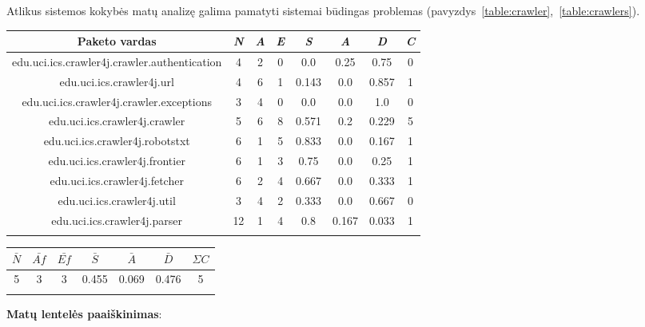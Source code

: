 Atlikus sistemos kokybės matų analizę galima pamatyti sistemai būdingas problemas (pavyzdys~\ref{table:crawler},~\ref{table:crawlers}).
\begin{center}
    \begin{tabular}{|c|c|c|c|c|c|c|c|}
        \hline
        Paketo vardas & \textit{N} & \textit{A} & \textit{E} & \textit{S} & \textit{A} & \textit{D} & \textit{C} \\ [0.5ex]
        \hline\hline
        edu.uci.ics.crawler4j.crawler.authentication & 4 & 2 & 0 & 0.0 & 0.25 & 0.75 & 0\\
        \hline
        edu.uci.ics.crawler4j.url & 4 & 6 & 1 & 0.143 & 0.0 & 0.857 & 1 \\
        \hline
        edu.uci.ics.crawler4j.crawler.exceptions & 3 & 4 & 0 & 0.0 & 0.0 & 1.0 & 0\\
        \hline
        edu.uci.ics.crawler4j.crawler & 5 & 6 & 8 & 0.571 & 0.2 & 0.229 & 5 \\
        \hline
        edu.uci.ics.crawler4j.robotstxt & 6 & 1 & 5 & 0.833 & 0.0 & 0.167 & 1 \\
        \hline
        edu.uci.ics.crawler4j.frontier & 6 & 1 & 3 & 0.75 & 0.0 & 0.25 & 1 \\
        \hline
        edu.uci.ics.crawler4j.fetcher & 6 & 2 & 4 & 0.667 & 0.0 & 0.333 & 1 \\
        \hline
        edu.uci.ics.crawler4j.util & 3 & 4 & 2 & 0.333 & 0.0 & 0.667 & 0 \\
        \hline
        edu.uci.ics.crawler4j.parser & 12 & 1 & 4 & 0.8 & 0.167 & 0.033 & 1 \\
        \hline
        \label{table:crawler}
    \end{tabular}
    \begin{tabular}{|c|c|c|c|c|c|c|}
        \hline
        $\bar{N}$ & $\bar{Af}$ & $\bar{Ef}$ & $\bar{S}$ & $\bar{A}$ & $\bar{D}$ & $\Sigma C$  \\ [0.5ex]
        \hline\hline
        5 & 3 & 3 & 0.455 & 0.069 & 0.476 & 5\\
        \hline
    \label{table:crawlers}
    \end{tabular}
\end{center}
\textbf{Matų lentelės paaiškinimas}:
